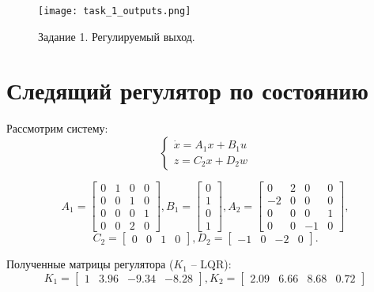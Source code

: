 \begin{figure}[]
    \centering
    \texttt{[image: task\_1\_outputs.png]}
    \caption{\label{fig:task4_3_2}Задание 1. Регулируемый выход.}
\end{figure}

\pagebreak

\section{Следящий регулятор по состоянию}

Рассмотрим систему:
\begin{equation}
    \begin{cases}
        \dot{x} = A_1x + B_1u \\
        z = C_2x + D_2w
    \end{cases}
\end{equation}

\begin{equation*}
    A_1 = \begin{bmatrix}
        0 & 1 & 0 & 0 \\
        0 & 0 & 1 & 0 \\
        0 & 0 & 0 & 1 \\
        0 & 0 & 2 & 0
    \end{bmatrix}, 
    B_1 = \begin{bmatrix}
        0 \\ 1 \\ 0 \\ 1
    \end{bmatrix},
    A_2 = \begin{bmatrix}
        0 & 2 & 0 & 0 \\
        -2 & 0 & 0 & 0 \\
        0 & 0 & 0 & 1 \\
        0 & 0 & -1 & 0
    \end{bmatrix}, 
\end{equation*}
\begin{equation*}
    C_2 = \begin{bmatrix}
        0 & 0 & 1 & 0
    \end{bmatrix},
    D_2 = \begin{bmatrix}
        -1 & 0 & -2 & 0
    \end{bmatrix}.
\end{equation*}

Полученные матрицы регулятора ($K_1$ -- LQR):
\begin{equation*}
    K_1 = \begin{bmatrix}
        1 & 3.96 & -9.34 & -8.28
    \end{bmatrix},
    K_2 = \begin{bmatrix}
        2.09 & 6.66 & 8.68 & 0.72
    \end{bmatrix}
\end{equation*}

